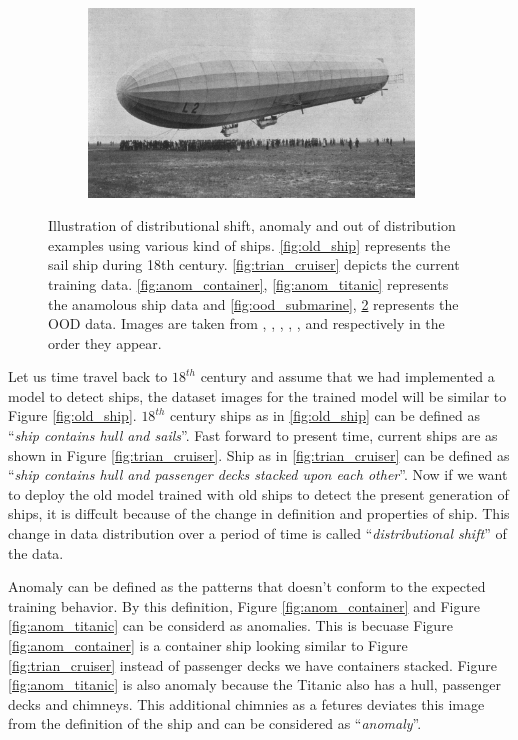 \begin{figure}[h!]
\begin{subfigure}{0.333\textwidth}
        \centering
        \includegraphics[height=0.15\textheight,width=0.95\textwidth]{images/intro_ood_anomaly/ood_airship.jpg}
        \caption{}
        \label{fig:ood_airship}
    \end{subfigure}
    \caption{Illustration of distributional shift, anomaly and out of distribution examples using various kind of ships. \ref{fig:old_ship} represents the sail ship during 18th century. \ref{fig:trian_cruiser} depicts the current training data.
    \ref{fig:anom_container}, \ref{fig:anom_titanic} represents the anamolous ship data and \ref{fig:ood_submarine}, \ref{fig:ood_airship} represents the OOD data. Images are taken from \cite{old_ship}, \cite{train_cruiser}, \cite{container},
    \cite{titanic}, \cite{submarine}, and \cite{airship} respectively in the order they appear.}
\end{figure}

Let us time travel back to $18^{th}$ century and assume that we had implemented a model to detect ships, the dataset images for the trained model will be similar to Figure \ref{fig:old_ship}.
$18^{th}$ century ships as in \ref{fig:old_ship} can be defined as ``\textit{ship contains hull and sails}''.
Fast forward to present time, current ships are as shown in Figure \ref{fig:trian_cruiser}.
Ship as in \ref{fig:trian_cruiser} can be defined as ``\textit{ship contains hull and passenger decks stacked upon each other}''.
Now if we want to deploy the old model trained with old ships to detect the present generation of ships, it is diffcult because of the change in definition and properties of ship. 
This change in data distribution over a period of time is called ``\textit{distributional shift}'' of the data.

Anomaly can be defined as the patterns that doesn't conform to the expected training behavior.
By this definition, Figure \ref{fig:anom_container} and Figure \ref{fig:anom_titanic} can be considerd as anomalies.
This is becuase Figure \ref{fig:anom_container} is a container ship looking similar to Figure \ref{fig:trian_cruiser} instead of passenger decks we have containers stacked.
Figure \ref{fig:anom_titanic} is also anomaly because the Titanic also has a hull, passenger decks and chimneys. 
This additional chimnies as a fetures deviates this image from the definition of the ship and can be considered as ``\textit{anomaly}''.

